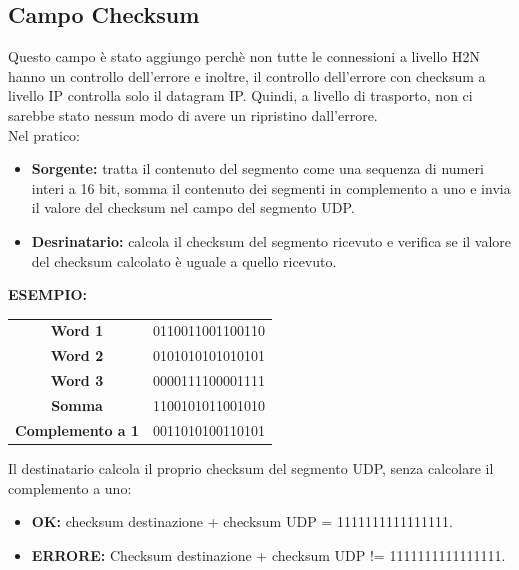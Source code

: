 \subsection{Campo Checksum}
Questo campo è stato aggiungo perchè non tutte le connessioni a livello H2N hanno un controllo dell'errore e inoltre, il controllo dell'errore con checksum a livello IP controlla solo il datagram IP.
Quindi, a livello di trasporto, non ci sarebbe stato nessun modo di avere un ripristino dall'errore.
\\
Nel pratico:
\begin{itemize}
    \item \textbf{Sorgente:} tratta il contenuto del segmento come una sequenza di numeri interi a 16 bit, somma il contenuto dei segmenti in complemento a uno e invia il valore del checksum nel campo del segmento UDP.
    \item \textbf{Desrinatario:} calcola il checksum del segmento ricevuto e verifica se il valore del checksum calcolato è uguale a quello ricevuto.
\end{itemize}

\vspace*{0.02\textheight}
\textbf{ESEMPIO:}
\vspace*{0.01\textheight}
\begin{center}
    \begin{tabular}{ c | c }
        \hline
        \textbf{Word 1} & 0110011001100110 \\
        \textbf{Word 2} & 0101010101010101 \\
        \textbf{Word 3} & 0000111100001111 \\
        \hline
        \textbf{Somma} & 1100101011001010 \\
        \hline
        \textbf{Complemento a 1} & 0011010100110101 \\
        \hline
    \end{tabular}
\end{center}
Il destinatario calcola il proprio checksum del segmento UDP, senza calcolare il complemento a uno:
\begin{itemize}
    \item \textbf{OK:} checksum destinazione + checksum UDP = 1111111111111111.
    \item \textbf{ERRORE:} Checksum destinazione + checksum UDP != 1111111111111111.
\end{itemize}

